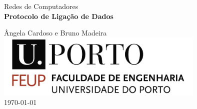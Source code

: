 

\begin{titlepage}
\begin{center}
 
\vspace*{3cm}

{\Large Redes de Computadores}\\[2cm]

{\Huge \bfseries Protocolo de Liga\c{c}\~ao de Dados \\[1cm]}

{\large \^Angela Cardoso e Bruno Madeira}\\[2cm]

\includegraphics[width=10cm]{feup_logo.jpg}\\[2cm]


{\large \today}

\end{center}
\end{titlepage}